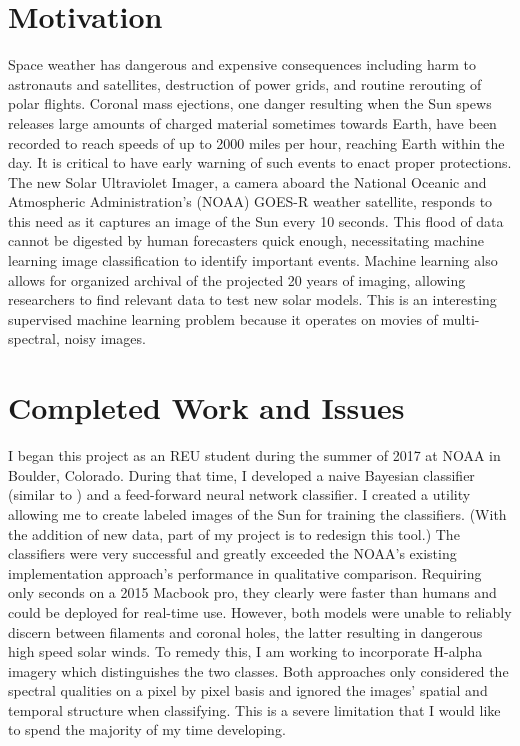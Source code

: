 \documentclass[11pt]{article}
\begin{document}
\section{Motivation}
Space weather has dangerous and expensive consequences including  harm to astronauts and satellites, destruction of power grids, and routine rerouting of polar flights. Coronal mass ejections, one danger resulting when the Sun spews releases large amounts of charged material sometimes towards Earth, have been recorded to reach speeds of up to 2000 miles per hour, reaching Earth within the day. It is critical to have early warning of such events to enact proper protections. The new Solar Ultraviolet Imager, a camera aboard the National Oceanic and Atmospheric Administration's (NOAA) GOES-R weather satellite, responds to this need as it captures an image of the Sun every 10 seconds. This flood of data cannot be digested by human forecasters quick enough, necessitating machine learning image classification to identify important events. Machine learning also allows for organized archival of the projected 20 years of imaging, allowing researchers to find relevant data to test new solar models. This is an interesting supervised machine learning problem because it operates on movies of multi-spectral, noisy images. 

\section{Completed Work and Issues}
I began this project as an REU student during the summer of 2017 at NOAA in Boulder, Colorado. During that time, I developed a naive Bayesian classifier (similar to \cite{rigler2012}) and a feed-forward neural network classifier. I created a utility allowing me to create labeled images of the Sun for training the classifiers. (With the addition of new data, part of my project is to redesign this tool.) The classifiers were very successful and greatly exceeded the NOAA's existing implementation approach's performance in qualitative comparison. Requiring only seconds on a 2015 Macbook pro, they clearly were faster than humans and could be deployed for real-time use.  However, both models were unable to reliably discern between filaments and coronal holes, the latter resulting in dangerous high speed solar winds. To remedy this, I am working to incorporate H-alpha imagery which distinguishes the two classes. Both approaches only considered the spectral qualities on a pixel by pixel basis and ignored the images' spatial and temporal structure when classifying. This is a severe limitation that I would like to spend the majority of my time developing. 
\end{document}

